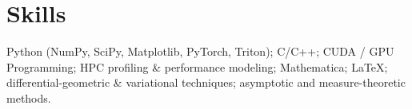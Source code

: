 \section{Skills}

\noindent
Python (NumPy, SciPy, Matplotlib, PyTorch, Triton); C/C++; CUDA / GPU Programming; HPC profiling \& performance modeling; Mathematica; \LaTeX; differential-geometric \& variational techniques; asymptotic and measure-theoretic methods.

\vspace{\topsep}
